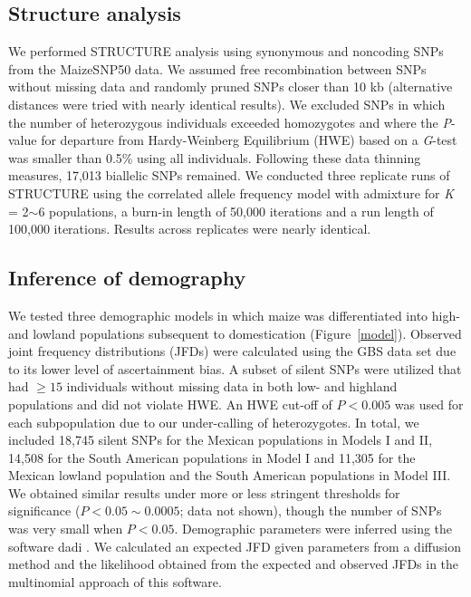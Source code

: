\subsection*{Structure analysis}
We performed {\sf STRUCTURE} analysis \cite[]{Pritchard_2000_10835412,Falush_2003_12930761} using  synonymous and noncoding SNPs from the MaizeSNP50 data. 
We assumed free recombination between SNPs without missing data and randomly pruned SNPs closer than 10 kb (alternative distances were tried with nearly identical results). 
We excluded SNPs in which the number of heterozygous individuals exceeded homozygotes and where the \emph{P}-value for departure from Hardy-Weinberg Equilibrium (HWE) based on a \emph{G}-test was smaller than 0.5\% using all individuals. 
Following these data thinning measures, 17,013 biallelic SNPs remained. 
We conducted three replicate runs of {\sf STRUCTURE} using the correlated allele frequency model with admixture for \emph{K} = 2$\sim$6 populations, a burn-in length of 50,000 iterations and a run length of 100,000 iterations. 
Results across replicates were nearly identical.

\subsection*{Inference of demography}
We tested three demographic models in which maize was differentiated into high- and lowland populations subsequent to domestication (Figure~\ref{model}). 
Observed joint frequency distributions (JFDs) were calculated using the GBS data set due to its lower level of ascertainment bias. 
A subset of silent SNPs were utilized that had $\geq15$ individuals without missing data in both low- and highland populations and did not violate HWE.  
An HWE cut-off of $P<0.005$ was used for each subpopulation due to our under-calling of heterozygotes. 
In total, we included 18,745 silent SNPs for the Mexican populations in Models I and II, 14,508 for the South American populations in Model I and 11,305 for the Mexican lowland population and the South American populations in Model III.  
We obtained similar results under more or less stringent thresholds for significance ($P < 0.05\sim0.0005$; data not shown), though the number of SNPs was very small when $P<0.05$.  
Demographic parameters were inferred using the software {\sf dadi} \cite[]{Gutenkunst_2009_19851460}.  We calculated an expected JFD given parameters from a diffusion method and the likelihood obtained from the expected and observed JFDs in the multinomial approach of this software. \\

